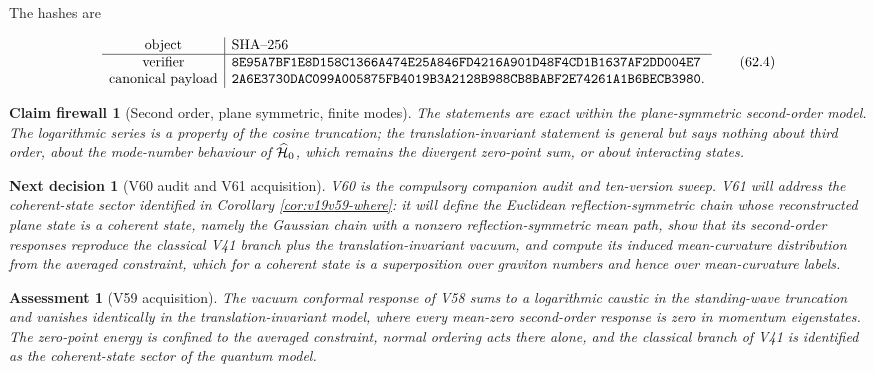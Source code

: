 \documentclass[11pt]{article}
\newtheorem{firewall}[theorem]{Claim firewall}
\newtheorem{decision}[theorem]{Next decision}
\newtheorem{assessment}[theorem]{Assessment}
\theoremstyle{remark}
\begin{document}
The hashes are

\[
\begin{array}{c|l}
\hbox{object}&\hbox{SHA--256}\\ \hline
\hbox{verifier}&
\texttt{8E95A7BF1E8D158C1366A474E25A846FD4216A901D48F4CD1B1637AF2DD004E7}\\
\hbox{canonical payload}&
\texttt{2A6E3730DAC099A005875FB4019B3A2128B988CB8BABF2E74261A1B6BECB3980}.
\end{array}                                                     \tag{62.4}
\]

\begin{firewall}[Second order, plane symmetric, finite modes]
\label{fire:v19v59}
The statements are exact within the plane-symmetric second-order
model.  The logarithmic series is a property of the cosine truncation;
the translation-invariant statement is general but says nothing about
third order, about the mode-number behaviour of \(\widehat{\cal H}_0\),
which remains the divergent zero-point sum, or about interacting
states.
\end{firewall}

\begin{decision}[V60 audit and V61 acquisition]
\label{dec:v19v59-next}
V60 is the compulsory companion audit and ten-version sweep.  V61 will
address the coherent-state sector identified in Corollary
\ref{cor:v19v59-where}: it will define the Euclidean reflection-symmetric
chain whose reconstructed plane state is a coherent state, namely the
Gaussian chain with a nonzero reflection-symmetric mean path, show that
its second-order responses reproduce the classical V41 branch plus the
translation-invariant vacuum, and compute its induced mean-curvature
distribution from the averaged constraint, which for a coherent state
is a superposition over graviton numbers and hence over mean-curvature
labels.
\end{decision}

\begin{assessment}[V59 acquisition]
\label{ass:v19v59}
The vacuum conformal response of V58 sums to a logarithmic caustic in
the standing-wave truncation and vanishes identically in the
translation-invariant model, where every mean-zero second-order
response is zero in momentum eigenstates.  The zero-point energy is
confined to the averaged constraint, normal ordering acts there alone,
and the classical branch of V41 is identified as the coherent-state
sector of the quantum model.
\end{assessment}
\end{document}

